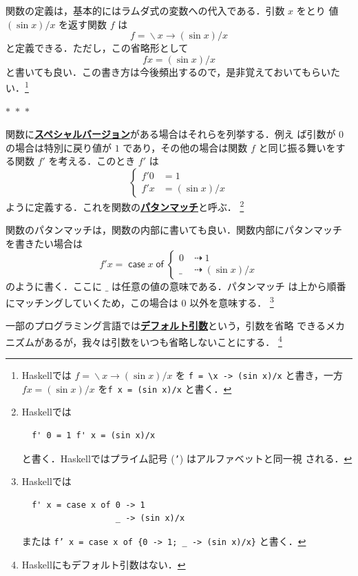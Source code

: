 \documentclass[a5paper,twoside,fleqn,draft]{jsbook}
\newcommand{\separator}{\begin{center}$*$~$*$~$*$\end{center}}
\newcommand{\programminglanguage}[1]{\textsf{#1}}
\newcommand{\haskell}{\programminglanguage{Haskell}}
\newcommand{\keyword}[1]{{\underline{\textbf{#1}}}}
\newcommand{\code}[1]{\texttt{#1}}
\newcommand{\mKeyword}[1]{\mathsf{#1}}
\newcommand{\mCaseKeyword}{\mKeyword{case}}
\newcommand{\mOfKeyword}{\mKeyword{of}}
\DeclareMathOperator{\mCaseKW}{\mCaseKeyword}
\DeclareMathOperator{\mOfKW}{\mOfKeyword}
\DeclareMathOperator{\mIfSo}{\dashrightarrow}
\DeclareMathOperator{\mLambda}{\backslash}
\DeclareMathOperator{\mLambdaArrow}{\rightarrow}
\newcommand{\mCaseOf}[1]{\mCaseKW#1\mOfKW}
\begin{document}
関数の定義は，基本的にはラムダ式の変数への代入である．引数 $x$ をとり
値 $(\sin x)/x$ を返す関数 $f$ は
\begin{equation}
  f
  =\mLambda x\mLambdaArrow(\sin x)/x
\end{equation}
と定義できる．ただし，この省略形として
\begin{equation}
  fx
  =(\sin x)/x
\end{equation}
と書いても良い．この書き方は今後頻出するので，是非覚えておいてもらいた
い．\footnote{\haskell では $f=\mLambda x\mLambdaArrow(\sin x)/x$ を
  \code{f = \textbackslash x -> (sin x)/x} と書き，一方 $fx=(\sin
  x)/x$ を\code{f x = (sin x)/x} と書く．}

\separator

関数に\keyword{スペシャルバージョン}がある場合はそれらを列挙する．例え
ば引数が $0$ の場合は特別に戻り値が $1$ であり，その他の場合は関数 $f$
と同じ振る舞いをする関数 $f'$ を考える．このとき $f'$ は
\begin{equation}
  \left\{
  \begin{aligned}
    f'0&=1\\
    f'x&=(\sin x)/x
  \end{aligned}
  \right.
\end{equation}
ように定義する．これを関数の\keyword{パタンマッチ}と呼ぶ．
\footnote{\haskell では
\begin{verbatim}
  f' 0 = 1 f' x = (sin x)/x
\end{verbatim}
と書く．\haskell ではプライム記号 (\code{'}) はアルファベットと同一視
される．}

関数のパタンマッチは，関数の内部に書いても良い．関数内部にパタンマッチ
を書きたい場合は
\begin{equation}
  f'x=\mCaseOf{x}
  \begin{cases}
    0&\mIfSo1\\
    \_&\mIfSo(\sin x)/x
  \end{cases}
\end{equation}
のように書く．ここに $\_$ は任意の値の意味である．パタンマッチ
は上から順番にマッチングしていくため，この場合は $0$ 以外を意味する．
\footnote{\haskell では
\begin{verbatim}
  f' x = case x of 0 -> 1
                   _ -> (sin x)/x
\end{verbatim}
または \code{f' x = case x of \{0 -> 1; \_ -> (sin x)/x\}} と書く．}

一部のプログラミング言語では\keyword{デフォルト引数}という，引数を省略
できるメカニズムがあるが，我々は引数をいつも省略しないことにする．
\footnote{\haskell にもデフォルト引数はない．}
\end{document}
